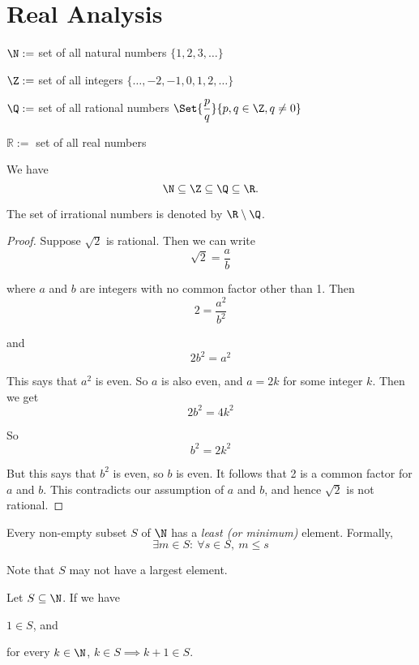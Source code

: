 \section{Real Analysis}\label{cd94400}

\label{d52c6b7}

\begin{enumerati}
  \item $\N:=$ set of all natural numbers $\{1,2,3,\ldots\}$
  \item $\Z:=$ set of all integers $\{\ldots,-2,-1,0,1,2,\ldots\}$
  \item $\Q:=$ set of all rational numbers $\Set{\dfrac pq}{p,q\in\Z,q\neq0}$
  \item $\mathbb R:=$ set of all real numbers
\end{enumerati}

We have
$$
  \N\subseteq\Z\subseteq\Q\subseteq\R.
$$

The set of irrational numbers is denoted by $\R\setminus\Q$.

\label{c2585a1}

\begin{proof}
  Suppose $\sqrt2$ is rational. Then we can write
  $$\sqrt2=\frac ab$$

  where $a$ and $b$ are integers with no common factor other than 1. Then
  $$2=\frac{a^2}{b^2}$$

  and
  $$2b^2=a^2$$

  This says that $a^2$ is even. So $a$ is also even, and $a=2k$ for some integer
  $k$. Then we get
  $$2b^2=4k^2$$

  So
  $$b^2=2k^2$$

  But this says that $b^2$ is even, so $b$ is even. It follows that 2 is a common
  factor for $a$ and $b$. This contradicts our assumption of $a$ and $b$, and
  hence $\sqrt2$ is not rational.
\end{proof}

\label{cd7c4d1}

Every non-empty subset $S$ of $\N$ has a \textit{least (or minimum)} element.
Formally,
$$
  \exists m\in S:\ \forall s\in S,\ m\leq s
$$

Note that $S$ may not have a largest element.

\label{a824f8c}

Let $S\subseteq\N$. If we have
\begin{enumerati}
  \item $1\in S$, and
  \item for every $k\in\N$, $k\in S\implies k+1\in S$.
\end{enumerati}

